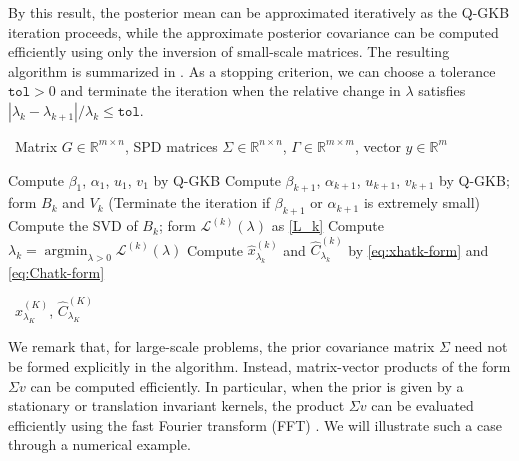 \documentclass[]{myarticle}
\newcommand\argmin{\mathop{\mathrm{argmin}}}
\begin{document}
By this result, the posterior mean can be approximated iteratively as the Q-GKB iteration proceeds, while the approximate posterior covariance can be computed efficiently using only the inversion of small-scale matrices. The resulting algorithm is summarized in . As a stopping criterion, we can choose a tolerance $\mathtt{tol}>0$ and terminate the iteration when the relative change in $\lambda$ satisfies $|\lambda_k-\lambda_{k+1}|/\lambda_k\leq \mathtt{tol}$.

\begin{algorithm}[htbp]
\caption{Q-GKB based posterior approximation}
\label{alg2}
\algorithmicrequire \ Matrix $G\in\mathbb{R}^{m\times n}$, SPD matrices $\Sigma\in\mathbb{R}^{n\times n}$,  $\Gamma\in\mathbb{R}^{m\times m}$, vector $y\in\mathbb{R}^{m}$
\begin{algorithmic}[1]
\State Compute $\beta_1$, $\alpha_1$, $u_1$, $v_1$ by Q-GKB
\State Compute $\beta_{k+1}$, $\alpha_{k+1}$, $u_{k+1}$, $v_{k+1}$ by Q-GKB; form $B_{k}$ and $V_{k}$
\State (Terminate the iteration if $\beta_{k+1}$ or $\alpha_{k+1}$ is extremely small)
\State Compute the SVD of $B_k$; form $\mathcal{L}^{(k)}(\lambda)$ as \cref{L_k} 
\State Compute $\lambda_k = \argmin_{\lambda>0}\mathcal{L}^{(k)}(\lambda)$
\State Compute $\widehat{x}_{\lambda_k}^{(k)}$ and $\widehat{C}_{\lambda_k}^{(k)}$ by \cref{eq:xhatk-form} and \cref{eq:Chatk-form}
\EndFor
\end{algorithmic}
\algorithmicensure \ $\widehat{x}_{\lambda_K}^{(K)}$, $\widehat{C}_{\lambda_K}^{(K)}$
\end{algorithm}

We remark that, for large-scale problems, the prior covariance matrix $\Sigma$ need not be formed explicitly in the algorithm. Instead, matrix-vector products of the form $\Sigma v$ can be computed efficiently. In particular, when the prior is given by a stationary or translation invariant kernels, the product $\Sigma v$ can be evaluated efficiently using the fast Fourier transform (FFT) \cite{nowak2003efficient,Williams2006gaussian}. We will illustrate such a case through a numerical example.

\end{document}
